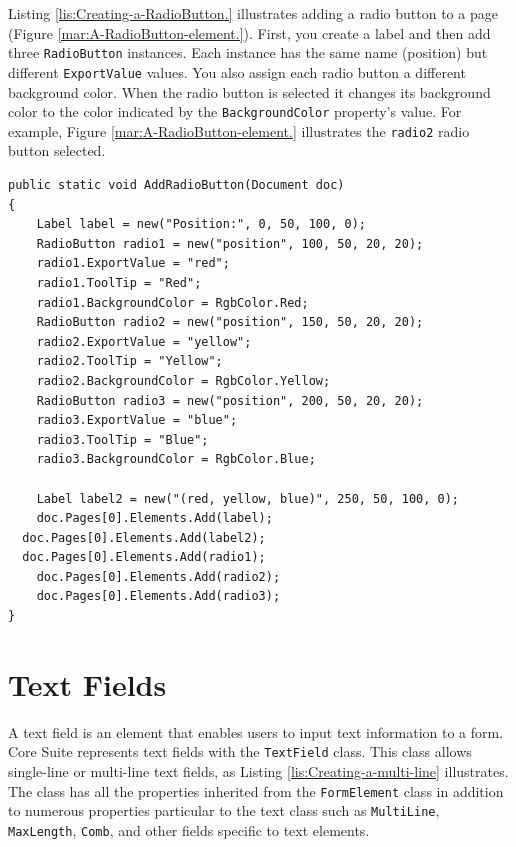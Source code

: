 \documentclass[american,letterpaper]{tufte-book}
\numberwithin{equation}{section}
\numberwithin{figure}{section}
\begin{document}
{Listing \ref{lis:Creating-a-RadioButton.} illustrates adding a radio
button to a page (Figure \ref{mar:A-RadioButton-element.}). First,
you create a label and then add three \texttt{RadioButton} instances.
Each instance has the same name (position) but different \texttt{ExportValue}
values. You also assign each radio button a different background color.
When the radio button is selected it changes its background color
to the color indicated by the \texttt{BackgroundColor} property's
value. For example, Figure \ref{mar:A-RadioButton-element.} illustrates
the \texttt{radio2} radio button selected.

\bgroup{}
\begin{lstlisting}[caption={Creating a RadioButton.},label={lis:Creating-a-RadioButton.},basicstyle={\small\ttfamily},breaklines=true]
public static void AddRadioButton(Document doc)
{
    Label label = new("Position:", 0, 50, 100, 0);
    RadioButton radio1 = new("position", 100, 50, 20, 20);
    radio1.ExportValue = "red";
    radio1.ToolTip = "Red";
    radio1.BackgroundColor = RgbColor.Red;
    RadioButton radio2 = new("position", 150, 50, 20, 20);
    radio2.ExportValue = "yellow";
    radio2.ToolTip = "Yellow";
    radio2.BackgroundColor = RgbColor.Yellow;
    RadioButton radio3 = new("position", 200, 50, 20, 20);
    radio3.ExportValue = "blue";
    radio3.ToolTip = "Blue";
    radio3.BackgroundColor = RgbColor.Blue;

    Label label2 = new("(red, yellow, blue)", 250, 50, 100, 0);
    doc.Pages[0].Elements.Add(label);
  doc.Pages[0].Elements.Add(label2);
  doc.Pages[0].Elements.Add(radio1);
    doc.Pages[0].Elements.Add(radio2);
    doc.Pages[0].Elements.Add(radio3);
}
\end{lstlisting}
\leavevmode\egroup


\section{Text Fields}

A text field is an element that enables users to input text information
to a form. Core Suite represents text fields with the \texttt{TextField}
class. This class allows single-line or multi-line text fields, as
Listing \ref{lis:Creating-a-multi-line} illustrates. The class has
all the properties inherited from the \texttt{FormElement} class in
addition to numerous properties particular to the text class such
as \texttt{MultiLine}, \texttt{MaxLength}, \texttt{Comb}, and other
fields specific to text elements.

}
\end{document}
